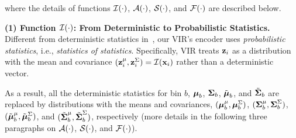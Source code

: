 \endgroup
{where the details of functions ${\mathcal I}(\cdot)$, ${\mathcal A}(\cdot)$, ${\mathcal S}(\cdot)$, and ${\mathcal F}(\cdot)$ are described below. }


\textbf{(1) Function ${\mathcal I}(\cdot)$: From Deterministic to Probabilistic Statistics.} 
Different from deterministic statistics in~\citep{DIR}, our VIR's encoder uses \emph{probabilistic statistics}, i.e., \emph{statistics of statistics}. Specifically, VIR treats ${\bf z}_i$ as a distribution with the mean and covariance $({\bf z}_i^\mu,{\bf z}_i^\Sigma)={\mathcal I}({\bf x}_i)$ rather than a deterministic vector. 

As a result, all the deterministic statistics for bin $b$, $\mbox{\boldmath$\mu$\unboldmath}_{b}$, $\mbox{\boldmath$\Sigma$\unboldmath}_{b}$, $\Tilde{\mbox{\boldmath$\mu$\unboldmath}}_b$, and $\Tilde{\mbox{\boldmath$\Sigma$\unboldmath}}_b$ are replaced by distributions with the means and covariances, $(\mbox{\boldmath$\mu$\unboldmath}_{b}^{\mu}, \mbox{\boldmath$\mu$\unboldmath}_{b}^{\Sigma})$, $(\mbox{\boldmath$\Sigma$\unboldmath}_b^\mu,\mbox{\boldmath$\Sigma$\unboldmath}_b^\Sigma)$, $(\Tilde{\mbox{\boldmath$\mu$\unboldmath}}_b^{\mu}, \Tilde{\mbox{\boldmath$\mu$\unboldmath}}_b^{\Sigma})$, and $(\Tilde{\mbox{\boldmath$\Sigma$\unboldmath}}_b^\mu,\Tilde{\mbox{\boldmath$\Sigma$\unboldmath}}_b^\Sigma)$, respectively (more details in the following three paragraphs on ${\mathcal A}(\cdot)$, ${\mathcal S}(\cdot)$, and ${\mathcal F}(\cdot)$). 

